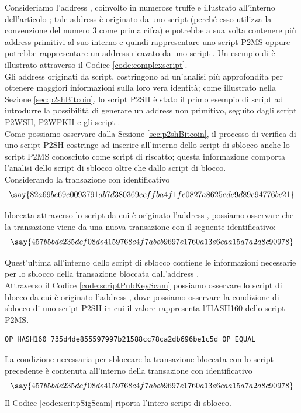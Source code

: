  \begin{example}\label{ex:probleGraphAddress}

Consideriamo l'address , coinvolto in numerose truffe e illustrato all'interno dell'articolo \cite{DBLP:conf/icdm/OggierPD18}; tale address è originato da uno script (perché esso utilizza la convenzione del numero 3 come prima cifra) e potrebbe a sua volta contenere più address primitivi al suo interno e quindi rappresentare uno script P2MS oppure potrebbe rappresentare un address ricavato da uno script . Un esempio di  è illustrato attraverso il Codice \ref{code:complexscript}.\\
   Gli address originati da script, costringono ad un'analisi più approfondita per ottenere maggiori informazioni sulla loro vera identità; come illustrato nella Sezione \ref{sec:p2shBitcoin}, lo script P2SH è stato il primo esempio di script ad introdurre la possibilità di generare un address non primitivo, seguito dagli script P2WSH, P2WPKH e gli script .\\
   Come possiamo osservare dalla Sezione \ref{sec:p2shBitcoin}, il processo di verifica di uno script P2SH costringe ad inserire all'interno dello script di sblocco anche lo script P2MS conosciuto come script di riscatto; questa informazione comporta l'analisi dello script di sblocco oltre che dallo script di blocco.\\
   Considerando la transazione con identificativo
   $$\say{82\-a69\-be69e\-00937\-91ab7\-d3803\-69ec\-ffba4f\-1fe08\-27a862\-5ede9\-d89e9\-4776b\-c21}$$

   \noindent bloccata attraverso lo script da cui è originato l'address , possiamo osservare che la transazione viene  da una nuova transazione con il seguente identificativo:
   $$\say{457\-b5bde2\-35dcf08\-de41597\-68c4f7\-abcb96\-97e1\-760a\-13e6\-caa15a\-7a2d8\-c909\-78}$$

   \noindent Quest'ultima all'interno dello script di sblocco contiene le informazioni necessarie per lo sblocco della transazione bloccata dall'address .\\
   Attraverso il Codice \ref{code:scriptPubKeyScam} possiamo osservare lo script di blocco da cui è originato l'address , dove possiamo osservare la condizione di sblocco di uno script P2SH in cui il valore  rappresenta l'HASH160 dello script P2MS.
   \begin{lstlisting}[language=bitcoinscript, label={code:scriptPubKeyScam}, caption={Script da cui è originato l'address preso in esempio.}]
      OP_HASH160 735d4de855597997b21588cc78ca2db696be1c5d OP_EQUAL
   \end{lstlisting}
   La condizione necessaria per sbloccare la transazione bloccata con lo script precedente è contenuta all'interno della transazione con identificativo
   $$\say{457\-b5bde2\-35dcf08\-de41597\-68c4f7\-abcb96\-97e1\-760a\-13e6\-caa15a\-7a2d8\-c909\-78}$$
   \noindent Il Codice \ref{code:scritpSigScam} riporta l'intero script di sblocco.


\end{example}
